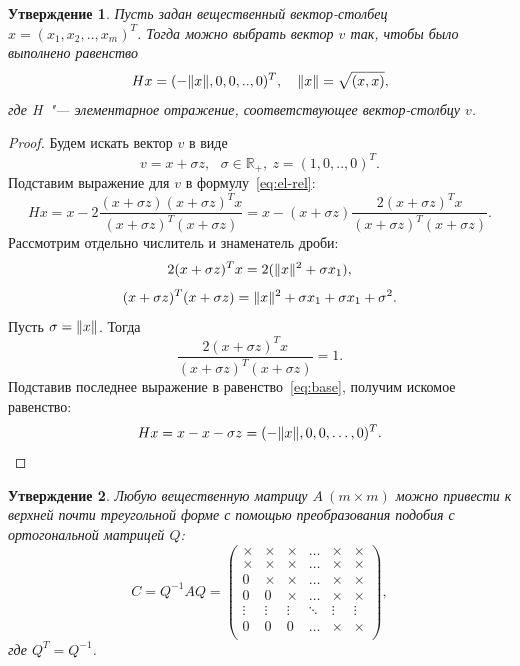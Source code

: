 \documentclass[11pt,a4paper,twoside,listtotoc,bibtotoc]{report}
\numberwithin{equation}{section}
\newtheorem*{statement}{Утверждение}
\theoremstyle{definition}
\theoremstyle{plain}
\DeclarePairedDelimiter\norm{\lVert}{\rVert}
\begin{document}
\begin{statement}
    Пусть задан вещественный вектор-столбец $x=(x_1, x_2, .. , x_m)^{T}$.
    Тогда можно выбрать вектор $v$ так, чтобы было выполнено равенство
    $$
        Hx=(-\norm{x},0,0,..,0)^{T}, ~~~\norm{x}=\sqrt{(x,x)},
    $$
    где H~"--- элементарное отражение, соответствующее вектор-столбцу $v$.
\end{statement}
%
%
\begin{proof}
    Будем искать вектор $v$ в виде
    $$
        v=x+\sigma z, ~~~\sigma \in \mathbb{R}_+,~z=(1,0,..,0)^{T}.
    $$
    Подставим выражение для $v$ в формулу~\eqref{eq:el-rel}:
    \begin{equation}
        \label{eq:base}
        Hx=x-2\frac{(x+\sigma z)(x+\sigma z)^{T}x}{(x+\sigma z)^{T}(x+\sigma z)}=
        x-(x+\sigma z)\frac{2(x+\sigma z)^{T}x}{(x+\sigma z)^{T}(x+\sigma z)}.
    \end{equation}
    Рассмотрим отдельно числитель и знаменатель дроби:
    $$
        2(x+\sigma z)^{T}x=2(\norm{x}^{2}+\sigma x_1),
    $$
    $$
        (x+\sigma z)^{T}(x+\sigma z)=\norm{x}^{2}+\sigma x_1 + \sigma x_1 + \sigma^{2}.
    $$
    Пусть $\sigma=\norm{x}$. Тогда
    $$
        \frac{2(x+\sigma z)^{T}x}{(x+\sigma z)^{T}(x+\sigma z)}=1.
    $$
    Подставив последнее выражение в равенство~\eqref{eq:base}, получим искомое
    равенство:
    $$
        Hx=x-x-\sigma z=(-\norm{x},0,0,\ldots,0)^{T}.
    $$
\end{proof}
%
%
\begin{statement}
Любую вещественную матрицу $A~(m \times m)$ можно привести к верхней почти треугольной
форме с помощью преобразования подобия с ортогональной матрицей $Q$:
%
$$
    C = Q^{-1}AQ =
    \begin{pmatrix}
        \times & \times & \times & \ldots & \times & \times\\
        \times & \times & \times & \ldots & \times & \times\\
        0      & \times & \times & \ldots & \times & \times\\
        0      &      0 & \times & \ldots & \times & \times\\
        \vdots & \vdots & \vdots & \ddots & \vdots & \vdots\\
        0      &      0 & 0      & \ldots & \times & \times\\
    \end{pmatrix},
$$
где $Q^T = Q^{-1}$.
%
\end{statement}
\end{document}
